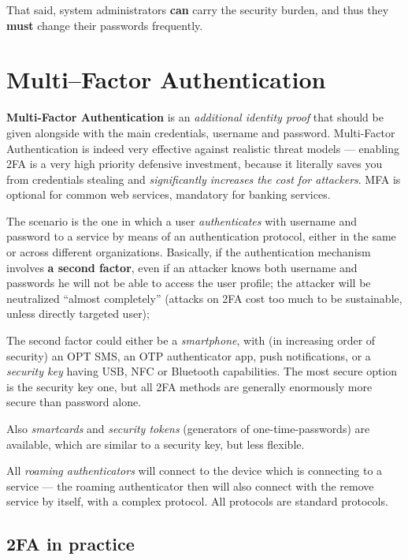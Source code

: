 \documentclass[10pt]{\classname}
\begin{document}
That said, system administrators \textbf{can} carry the security burden, and
thus they \textbf{must} change their passwords frequently.

\chapter{Multi--Factor Authentication}

\textbf{Multi\--Factor Authentication} is an \emph{additional identity proof}
that should be given alongside with the main credentials, username and
password. Multi\--Factor Authentication is indeed very effective against
realistic threat models --- enabling 2FA is a very high priority defensive
investment, because it literally saves you from credentials stealing and
\emph{significantly increases the cost for attackers}. MFA is optional for
common web services, mandatory for banking services.

The scenario is the one in which a user \emph{authenticates} with username and
password to a service by means of an authentication protocol, either in the
same or across different organizations. Basically, if the authentication
mechanism involves \textbf{a second factor}, even if an attacker knows both
username and passwords he will not be able to access the user profile; the
attacker will be neutralized ``almost completely'' (attacks on 2FA cost too
much to be sustainable, unless directly targeted user);

The second factor could either be a \emph{smartphone}, with (in increasing
order of security) an OPT SMS, an OTP authenticator app, push notifications, or
a \emph{security key} having USB, NFC or Bluetooth capabilities. The most
secure option is the security key one, but all 2FA methods are generally
enormously more secure than password alone.

Also \emph{smartcards} and \emph{security tokens} (generators of
one\--time\--passwords) are available, which are similar to a security key, but
less flexible.

All \emph{roaming authenticators} will connect to the device which is
connecting to a service --- the roaming authenticator then will also connect
with the remove service by itself, with a complex protocol. All protocols are
standard protocols.

\section{2FA in practice}
\end{document}
